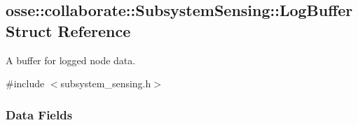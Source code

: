 \hypertarget{structosse_1_1collaborate_1_1_subsystem_sensing_1_1_log_buffer}{}\subsection{osse\+:\+:collaborate\+:\+:Subsystem\+Sensing\+:\+:Log\+Buffer Struct Reference}
\label{structosse_1_1collaborate_1_1_subsystem_sensing_1_1_log_buffer}


A buffer for logged node data.  




{\ttfamily \#include $<$subsystem\+\_\+sensing.\+h$>$}

\subsubsection*{Data Fields}
